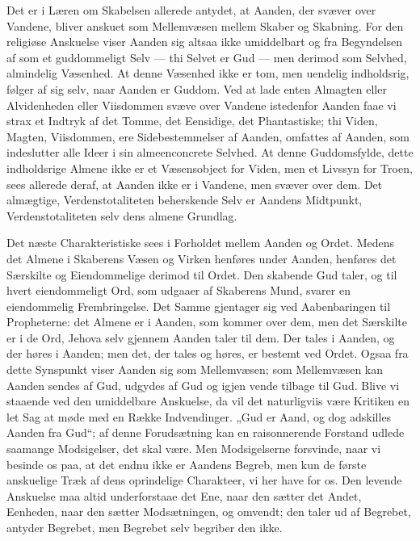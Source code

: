 \documentclass[12pt]{book}
\begin{document}
Det er i Læren om Skabelsen allerede antydet, at Aanden, der svæver
over Vandene, bliver anskuet som Mellemvæsen mellem Skaber og
Skabning. For den religiøse Anskuelse viser Aanden sig altsaa ikke
umiddelbart og fra Begyndelsen af som et guddommeligt Selv --- thi
Selvet er Gud --- men derimod som Selvhed, almindelig Væsenhed. At
denne Væsenhed ikke er tom, men uendelig indholdsrig, følger af sig
selv, naar Aanden er Guddom. Ved at lade enten Almagten eller
Alvidenheden eller Viisdommen svæve over Vandene istedenfor Aanden
faae vi strax et Indtryk af det Tomme, det Eensidige, det
Phantastiske; thi Viden, Magten, Viisdommen, ere Sidebestemmelser af
Aanden, omfattes af Aanden, som indeslutter alle Ideer i sin
almeenconcrete Selvhed. At denne Guddomsfylde, dette indholdsrige
Almene ikke er et Væsensobject for Viden, men et Livssyn for Troen,
sees allerede deraf, at Aanden ikke er i Vandene, men svæver over
dem. Det almægtige, Verdenstotaliteten beherskende Selv er Aandens
Midtpunkt, Verdenstotaliteten selv dens almene Grundlag.

Det næste Charakteristiske sees i Forholdet mellem Aanden og Ordet.
Medens det Almene i Skaberens Væsen og Virken henføres under Aanden,
henføres det Særskilte og Eiendommelige derimod til Ordet. Den
skabende Gud taler, og til hvert eiendommeligt Ord, som udgaaer af
Skaberens Mund, svarer en eiendommelig Frembringelse. Det Samme
gjentager sig ved Aabenbaringen til Propheterne: det Almene er i
Aanden, som kommer over dem, men det Særskilte er i de Ord, Jehova
selv gjennem Aanden taler til dem. Der tales i Aanden, og der høres
i Aanden; men det, der tales og høres, er bestemt ved Ordet. Ogsaa
fra dette Synspunkt viser Aanden sig som Mellemvæsen; som
Mellemvæsen kan Aanden sendes af Gud, udgydes af Gud og igjen vende
tilbage til Gud. Blive vi staaende ved den umiddelbare Anskuelse, da
vil det naturligviis være Kritiken en let Sag at møde med en Række
Indvendinger. „Gud er Aand, og dog adskilles Aanden fra Gud“; af
denne Forudsætning kan en raisonnerende Forstand udlede saamange
Modsigelser, det skal være. Men Modsigelserne forsvinde,
naar vi besinde os paa, at det endnu ikke er Aandens Begreb, men kun
de første anskuelige Træk af dens oprindelige Charakteer, vi her
have for os. Den levende Anskuelse maa altid underforstaae det Ene,
naar den sætter det Andet, Eenheden, naar den sætter Modsætningen,
og omvendt; den taler ud af Begrebet, antyder Begrebet, men Begrebet
selv begriber den ikke.
\end{document}
